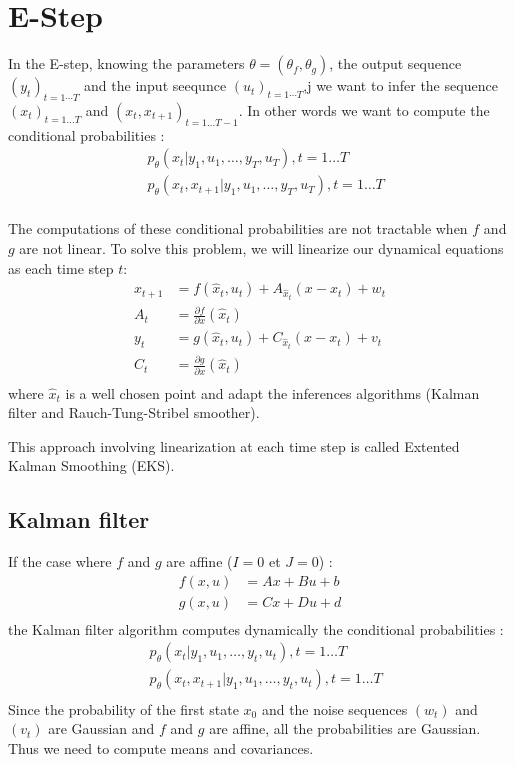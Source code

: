 \section{E-Step}

In the E-step, knowing the parameters $\theta = (\theta_f, \theta_g)$, the output sequence $(y_t)_{t=1 \cdots T}$ and the input seequnce $(u_t)_{t=1 \cdots T}$,j we want to infer the sequence $(x_t)_{t=1 \ldots T}$ and $(x_t, x_{t+1})_{t=1 \ldots T-1}$.
In other words we want to compute the conditional probabilities :
\begin{align*}
  &p_{\theta}\left(x_t|y_1, u_1, \ldots, y_T, u_T \right ), t=1 \ldots T\\
  &p_{\theta}\left(x_t, x_{t+1}|y_1, u_1, \ldots, y_T, u_T \right ), t=1 \ldots T\\
\end{align*}

The computations of these conditional probabilities are not tractable when $f$ and $g$ are not linear.
To solve this problem, we will linearize our dynamical equations as each time step $t$:
\begin{align*}
	x_{t+1} &= f(\hat{x}_t, u_t) + A_{\hat{x}_t} (x - x_t) + w_t\\
  A_t &= \frac{\partial f}{\partial x}(\hat{x}_t)\\
	y_t &= g(\hat{x}_t, u_t) + C_{\hat{x}_t} (x - x_t) + v_t\\
  C_t &= \frac{\partial g}{\partial x}(\hat{x}_t)\\
\end{align*}
where $\hat{x}_t$ is a well chosen point and adapt the inferences algorithms (Kalman filter and Rauch-Tung-Stribel smoother).

This approach involving linearization at each time step is called Extented Kalman Smoothing (EKS).

\subsection{Kalman filter}

If the case where $f$ and $g$ are affine ($I=0$ et $J=0$) :
\begin{align*}
  f(x,u) &= Ax + Bu + b\\
  g(x,u) &= Cx + Du + d\\
\end{align*}
the Kalman filter algorithm computes dynamically the conditional probabilities :
\begin{align*}
  &p_{\theta}\left(x_t|y_1, u_1, \ldots, y_t, u_t \right ), t=1 \ldots T\\
  &p_{\theta}\left(x_t, x_{t+1}|y_1, u_1, \ldots, y_t, u_t \right ), t=1 \ldots T\\
\end{align*}
Since the probability of the first state $x_0$ and the noise sequences $(w_t)$ and $(v_t)$ are Gaussian and $f$ and $g$ are affine, all the probabilities are Gaussian.
Thus we need to compute means and covariances.


